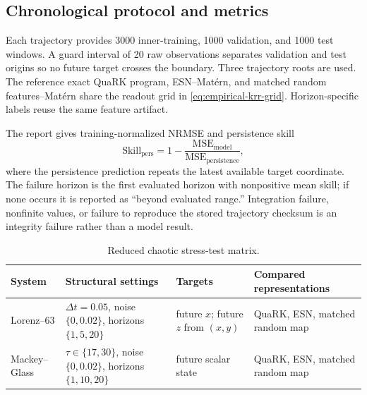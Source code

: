 \subsection{Chronological protocol and metrics}
\label{app:chaotic-protocol}

Each trajectory provides 3000 inner-training, 1000 validation, and 1000 test
windows.  A guard interval of 20 raw observations separates validation and test
origins so no future target crosses the boundary.  Three trajectory roots are
used.  The reference exact QuaRK program, ESN--Mat\'ern, and matched random
features--Mat\'ern share the readout grid in
\cref{eq:empirical-krr-grid}.  Horizon-specific labels reuse the same feature
artifact.

The report gives training-normalized NRMSE and persistence skill
\[
 \mathrm{Skill}_{\mathrm{pers}}
 =1-\frac{\mathrm{MSE}_{\mathrm{model}}}
          {\mathrm{MSE}_{\mathrm{persistence}}},
\]
where the persistence prediction repeats the latest available target
coordinate.  The failure horizon is the first evaluated horizon with
nonpositive mean skill; if none occurs it is reported as ``beyond evaluated
range.''  Integration failure, nonfinite values, or failure to reproduce the
stored trajectory checksum is an integrity failure rather than a model result.

\begin{table}[H]
\centering
\small
\caption{Reduced chaotic stress-test matrix.}
\label{tab:chaotic-suite}
\begin{tabularx}{\linewidth}{@{}lXXX@{}}
\toprule
System & Structural settings & Targets & Compared representations \\
\midrule
Lorenz--63 & \(\Delta t=0.05\), noise \(\{0,0.02\}\), horizons \(\{1,5,20\}\) & future \(x\); future \(z\) from \((x,y)\) & QuaRK, ESN, matched random map \\
Mackey--Glass & \(\tau\in\{17,30\}\), noise \(\{0,0.02\}\), horizons \(\{1,10,20\}\) & future scalar state & QuaRK, ESN, matched random map \\
\bottomrule
\end{tabularx}
\end{table}
